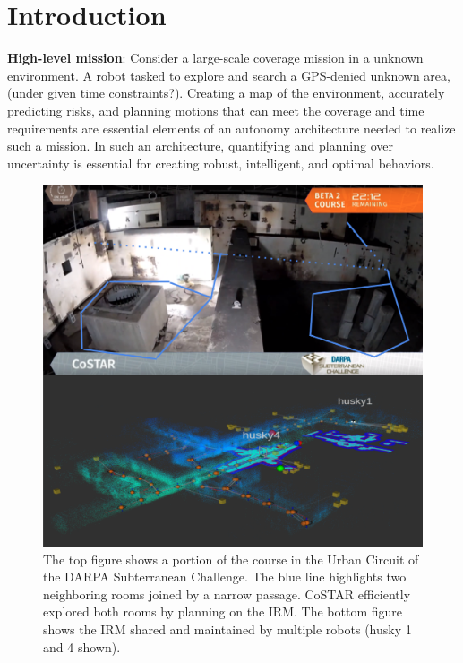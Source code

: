 \documentclass{article}
\newcommand{\ph}[1]{{\textbf{#1}:}} %
\begin{document}








\section{Introduction}

\ph{High-level mission} Consider a large-scale coverage mission in a unknown environment. A robot tasked to explore and search a GPS-denied unknown area, (under given time constraints?). Creating a map of the environment, accurately predicting risks, and planning motions that can meet the coverage and time requirements are essential elements of an autonomy architecture needed to realize such a mission.  In such an architecture, quantifying and planning over uncertainty is essential for creating robust, intelligent, and optimal behaviors.


\begin{figure}[t!]
  \centering
  \includegraphics[width=.48\textwidth]{figures/firstpage_v2.png}
  \caption{The top figure shows a portion of the course in the Urban Circuit of the DARPA Subterranean Challenge. The blue line highlights two neighboring rooms joined by a narrow passage. CoSTAR efficiently explored both rooms by planning on the IRM. The bottom figure shows the IRM shared and maintained by multiple robots (husky 1 and 4 shown).}
  \label{fig:firstPage}
\end{figure}
\end{document}
